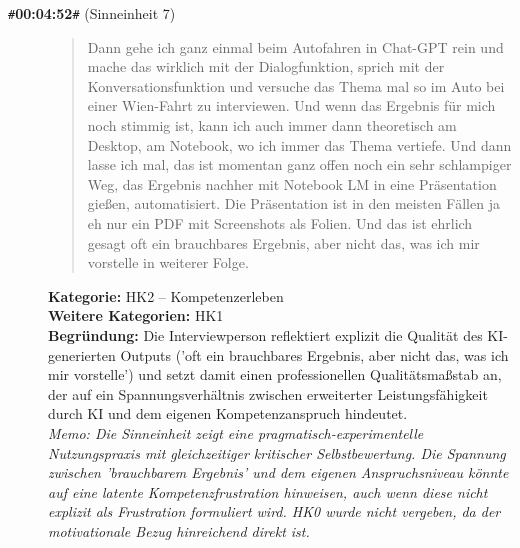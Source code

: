 \begin{description}
  \item[\texttt{\#}\textbf{00:04:52}\texttt{\#} (Sinneinheit 7)]
  \begin{quote}
  Dann gehe ich ganz einmal beim Autofahren in Chat-GPT rein und mache das wirklich mit der Dialogfunktion, sprich mit der Konversationsfunktion und versuche das Thema mal so im Auto bei einer Wien-Fahrt zu interviewen. Und wenn das Ergebnis für mich noch stimmig ist, kann ich auch immer dann theoretisch am Desktop, am Notebook, wo ich immer das Thema vertiefe. Und dann lasse ich mal, das ist momentan ganz offen noch ein sehr schlampiger Weg, das Ergebnis nachher mit Notebook LM in eine Präsentation gießen, automatisiert. Die Präsentation ist in den meisten Fällen ja eh nur ein PDF mit Screenshots als Folien. Und das ist ehrlich gesagt oft ein brauchbares Ergebnis, aber nicht das, was ich mir vorstelle in weiterer Folge.
  \end{quote}
  \textbf{Kategorie:} HK2 -- Kompetenzerleben\\
  \textbf{Weitere Kategorien:} HK1\\
  \textbf{Begr\"undung:} Die Interviewperson reflektiert explizit die Qualität des KI-generierten Outputs ('oft ein brauchbares Ergebnis, aber nicht das, was ich mir vorstelle') und setzt damit einen professionellen Qualitätsmaßstab an, der auf ein Spannungsverhältnis zwischen erweiterter Leistungsfähigkeit durch KI und dem eigenen Kompetenzanspruch hindeutet.
  \\\textit{Memo: Die Sinneinheit zeigt eine pragmatisch-experimentelle Nutzungspraxis mit gleichzeitiger kritischer Selbstbewertung. Die Spannung zwischen 'brauchbarem Ergebnis' und dem eigenen Anspruchsniveau könnte auf eine latente Kompetenzfrustration hinweisen, auch wenn diese nicht explizit als Frustration formuliert wird. HK0 wurde nicht vergeben, da der motivationale Bezug hinreichend direkt ist.}
\end{description}
\medskip

